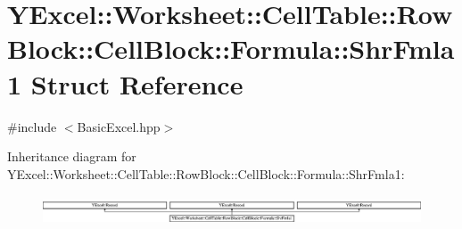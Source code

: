 \hypertarget{struct_y_excel_1_1_worksheet_1_1_cell_table_1_1_row_block_1_1_cell_block_1_1_formula_1_1_shr_fmla1}{}\section{Y\+Excel\+:\+:Worksheet\+:\+:Cell\+Table\+:\+:Row\+Block\+:\+:Cell\+Block\+:\+:Formula\+:\+:Shr\+Fmla1 Struct Reference}
\label{struct_y_excel_1_1_worksheet_1_1_cell_table_1_1_row_block_1_1_cell_block_1_1_formula_1_1_shr_fmla1}


{\ttfamily \#include $<$Basic\+Excel.\+hpp$>$}

Inheritance diagram for Y\+Excel\+:\+:Worksheet\+:\+:Cell\+Table\+:\+:Row\+Block\+:\+:Cell\+Block\+:\+:Formula\+:\+:Shr\+Fmla1\+:\begin{figure}[H]
\begin{center}
\leavevmode
\includegraphics[height=0.897436cm]{struct_y_excel_1_1_worksheet_1_1_cell_table_1_1_row_block_1_1_cell_block_1_1_formula_1_1_shr_fmla1}
\end{center}
\end{figure}
